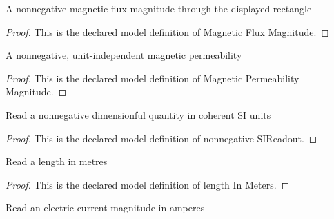 \begin{definition}
  \label{def:physics:phyx-mini-0975:phyxminiproblems-problemphyxmini0975-magneticfluxmagnitude}
  A nonnegative magnetic-flux magnitude through the displayed rectangle
\end{definition}
\begin{proof}
  This is the declared model definition of Magnetic Flux Magnitude.
\end{proof}
\begin{definition}
  \label{def:physics:phyx-mini-0975:phyxminiproblems-problemphyxmini0975-magneticpermeabilitymagnitude}
  A nonnegative, unit-independent magnetic permeability
\end{definition}
\begin{proof}
  This is the declared model definition of Magnetic Permeability Magnitude.
\end{proof}
\begin{definition}
  \label{def:physics:phyx-mini-0975:phyxminiproblems-problemphyxmini0975-nonnegativesireadout}
  Read a nonnegative dimensionful quantity in coherent SI units
\end{definition}
\begin{proof}
  This is the declared model definition of nonnegative SIReadout.
\end{proof}
\begin{definition}
  \label{def:physics:phyx-mini-0975:phyxminiproblems-problemphyxmini0975-lengthinmeters}
  Read a length in metres
\end{definition}
\begin{proof}
  This is the declared model definition of length In Meters.
\end{proof}
\begin{definition}
  \label{def:physics:phyx-mini-0975:phyxminiproblems-problemphyxmini0975-currentinamperes}
  Read an electric-current magnitude in amperes
\end{definition}
